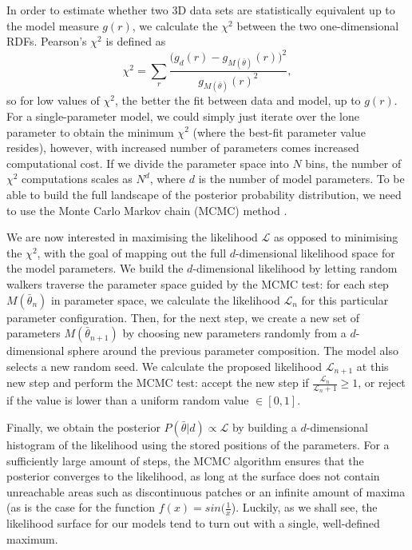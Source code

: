 \documentclass[aps,pre,twocolumn,letterpaper,floatfix,showpacs]{revtex4}
\begin{document}
In order to estimate whether two 3D data sets are statistically equivalent up to the model measure $g(r)$, we calculate the $\chi^2$ between the two one-dimensional RDFs. Pearson's $\chi^2$ is defined as 
\begin{equation}
  \chi^2 = \sum_r \frac{ \Big(g_d(r) - g_{M(\bar \theta)}(r) \Big)^2}{g_{M(\bar \theta)}(r)^2},
\end{equation}
so for low values of $\chi^2$, the better the fit between data and model, up to $g(r)$. For a single-parameter model, we could simply just iterate over the lone parameter to obtain the minimum $\chi^2$ (where the best-fit parameter value resides), however, with increased number of parameters comes increased computational cost. If we divide the parameter space into $N$ bins, the number of $\chi^2$ computations scales as $N^d$, where $d$ is the number of model parameters. To be able to build the full landscape of the posterior probability distribution, we need to use the Monte Carlo Markov chain (MCMC) method .

We are now interested in maximising the likelihood $\mathcal L$ as opposed to minimising the $\chi^2$, with the goal of mapping out the full $d$-dimensional likelihood space for the model parameters. We build the $d$-dimensional likelihood by letting random walkers traverse the parameter space guided by the MCMC test: for each step $M(\bar \theta_{n})$ in parameter space, we calculate the likelihood $\mathcal L_n$ for this particular parameter configuration. Then, for the next step, we create a new set of parameters $M(\bar \theta_{n+1})$ by choosing new parameters randomly from a $d$-dimensional sphere around the previous parameter composition. The model also selects a new random seed. We calculate the proposed likelihood $\mathcal L_{n+1}$ at this new step and perform the MCMC test: accept the new step if $\frac{\mathcal L_n}{\mathcal L_n+1} \ge 1$, or reject if the value is lower than a uniform random value $\in [0,1]$. 

Finally, we obtain the posterior $P(\bar \theta | d) \propto \mathcal L$ by building a $d$-dimensional histogram of the likelihood using the stored positions of the parameters. For a sufficiently large amount of steps, the MCMC algorithm ensures that the posterior converges to the likelihood, as long at the surface does not contain unreachable areas such as discontinuous patches or an infinite amount of maxima (as is the case for the function $f(x)=sin(\frac{1}{x}$). Luckily, as we shall see, the likelihood surface for our models tend to turn out with a single, well-defined maximum.  
\end{document}
